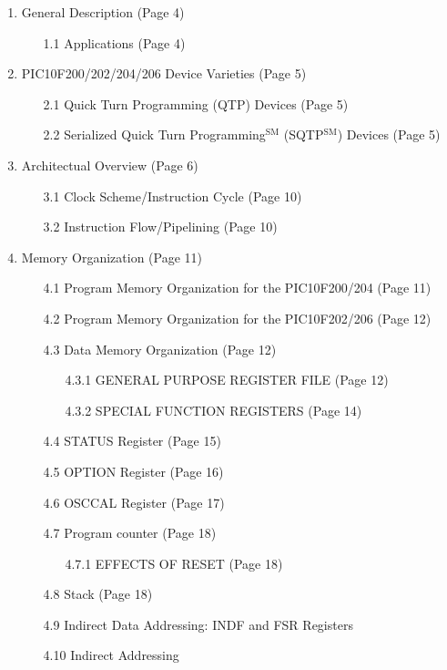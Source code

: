 \documentclass[12pt, letterpaper]{article}
\begin{document}
\renewcommand{\labelenumii}{\arabic{enumii}}          %
\begin{enumerate}

  \item General Description (Page 4)
  \begin{enumerate}
    \item [1.1] Applications (Page 4)
  \end{enumerate}

  \item PIC10F200/202/204/206 Device Varieties (Page 5)
  \begin{enumerate}
    \item [2.1] Quick Turn Programming (QTP) Devices (Page 5)
    \item [2.2] Serialized Quick Turn Programming$^\text{SM}$ (SQTP$^\text{SM}$) Devices (Page 5)
  \end{enumerate}

  \item Architectual Overview (Page 6)
  \begin{enumerate}
    \item [3.1] Clock Scheme/Instruction Cycle (Page 10)
    \item [3.2] Instruction Flow/Pipelining (Page 10)
  \end{enumerate}

  \item Memory Organization (Page 11)
  \begin{enumerate}
    \item [4.1] Program Memory Organization for the PIC10F200/204 (Page 11)
    \item [4.2] Program Memory Organization for the PIC10F202/206 (Page 12)
    \item [4.3] Data Memory Organization (Page 12)
    \begin{enumerate}
      \item [4.3.1] GENERAL PURPOSE REGISTER FILE (Page 12)
      \item [4.3.2] SPECIAL FUNCTION REGISTERS (Page 14)
    \end{enumerate}
    \item [4.4] STATUS Register (Page 15)
    \item [4.5] OPTION Register (Page 16)
    \item [4.6] OSCCAL Register (Page 17)
    \item [4.7] Program counter (Page 18)
    \begin{enumerate}
      \item [4.7.1] EFFECTS OF RESET (Page 18)
    \end{enumerate}
    \item [4.8] Stack (Page 18)
    \item [4.9] Indirect Data Addressing: INDF and FSR Registers
    \item [4.10] Indirect Addressing
  \end{enumerate}


\end{enumerate}
\end{document}
